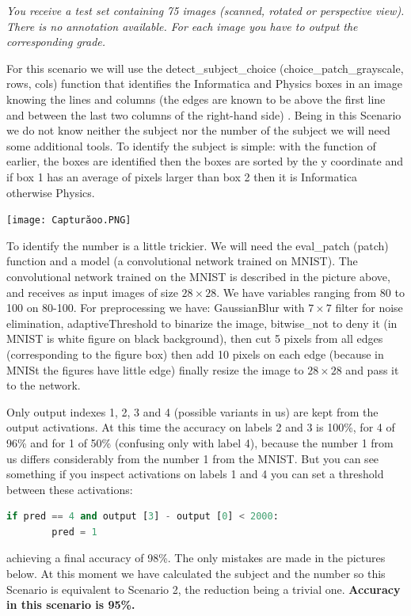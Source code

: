 \documentclass[12pt]{article}
\begin{document}
\emph{You receive a test set containing 75 images (scanned, rotated or perspective view). There is 
no annotation available. For each image you have to output the corresponding grade.}

For this scenario we will use the detect\_subject\_choice (choice\_patch\_grayscale, rows, cols) 
function that identifies the Informatica and Physics boxes in an image knowing the lines and 
columns (the edges are known to be above the first line and between the last two columns of 
the right-hand side) . Being in this Scenario we do not know neither the subject nor the number 
of the subject we will need some additional tools. To identify the subject is simple: with the 
function of earlier, the boxes are identified then the boxes are sorted by the y coordinate 
and if box 1 has an average of pixels larger than box 2 then it is Informatica otherwise Physics. 
\par

\texttt{[image: Capturăoo.PNG]}

To identify the number is a little trickier. We will need the eval\_patch (patch) function and 
a model (a convolutional network trained on MNIST). The convolutional network trained on the 
MNIST is described in the picture above, and receives as input images of size $28\times28$. We have 
variables ranging from 80 to 100 on 80-100. For preprocessing we have: GaussianBlur with 
$7\times7$ filter for noise elimination, adaptiveThreshold to binarize the image, bitwise\_not to 
deny it (in MNIST is white figure on black background), then cut 5 pixels from all edges 
(corresponding to the figure box) then add 10 pixels on each edge (because in MNISt the 
figures have little edge) finally resize the image to $28\times28$ and pass it to the network. 
\par

Only output indexes 1, 2, 3 and 4 (possible variants in us) are kept from the output activations. 
At this time the accuracy on labels 2 and 3 is 100\%, for 4 of 96\% and for 1 of 50\% 
(confusing only with label 4), because the number 1 from us differs considerably from 
the number 1 from the MNIST. But you can see something if you inspect activations on 
labels 1 and 4 you can set a threshold between these activations:
\begin{lstlisting}[language=Python]
    if pred == 4 and output [3] - output [0] < 2000:
        pred = 1
\end{lstlisting}
achieving a final accuracy of 98\%. The only mistakes are made in the pictures below.
At this moment we have calculated the subject and the number so this Scenario is equivalent 
to Scenario 2, the reduction being a trivial one.
\textbf{Accuracy in this scenario is 95\%.}
\end{document}
